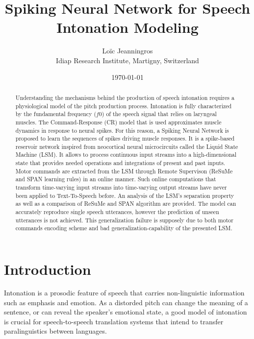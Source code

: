 \documentclass[11pt, a4paper]{article} %
\title{Spiking Neural Network for Speech Intonation Modeling} %
\author{
Lo\"{i}c Jeanningros %
\\
Idiap Research Institute, Martigny, Switzerland
  }
\date{\small \today} %
\begin{document}
%

\maketitle %



\setcounter{page}{1} %



\begin{abstract}
Understanding the mechanisms behind the production of speech intonation requires a physiological model of the pitch production process. Intonation is fully characterized by the fundamental frequency ($f0$) of the speech signal that relies on laryngeal muscles. The Command-Response (CR) model that is used approximates muscle dynamics in response to neural spikes. For this reason, a Spiking Neural Network is proposed to learn the sequences of spikes driving muscle responses. It is a spike-based reservoir network inspired from neocortical neural microcircuits called the Liquid State Machine (LSM). It allows to process continuous input streams into a high-dimensional state that provides needed operations and integrations of present and past inputs. Motor commands are extracted from the LSM through Remote Supervison (ReSuMe and SPAN learning rules) in an online manner. Such online computations that transform time-varying input streams into time-varying output streams have never been applied to Text-To-Speech before. An analysis of the LSM's separation property as well as a comparison of ReSuMe and SPAN algorithm are provided. The model can accurately reproduce single speech utterances, however the prediction of unseen utterances is not achieved. This generalization failure is supposely due to both motor commands encoding scheme and bad generalization-capability of the presented LSM.
\end{abstract}


\section{Introduction}
Intonation is a prosodic feature of speech that carries non-linguistic information such as emphasis and emotion. As a distorded pitch can change the meaning of a sentence, or can reveal the speaker's emotional state, a good model of intonation is crucial for speech-to-speech translation systems that intend to transfer paralinguistics between languages.
\end{document}
